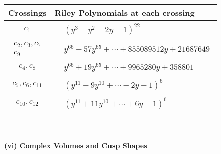 \documentclass[1p]{elsarticle_modified}
\theoremstyle{definition}
\begin{document}
\begin{tabular}{m{50pt}|m{274pt}}
Crossings & \hspace{64pt}Riley Polynomials at each crossing \\
\hline $$\begin{aligned}c_{1}\end{aligned}$$&$\begin{aligned}
&(y^3- y^2+2 y-1)^{22}
\end{aligned}$\\
\hline $$\begin{aligned}c_{2},c_{3},c_{7}\\c_{9}\end{aligned}$$&$\begin{aligned}
&y^{66}-57 y^{65}+\cdots+855089512 y+21687649
\end{aligned}$\\
\hline $$\begin{aligned}c_{4},c_{8}\end{aligned}$$&$\begin{aligned}
&y^{66}+19 y^{65}+\cdots+9965280 y+358801
\end{aligned}$\\
\hline $$\begin{aligned}c_{5},c_{6},c_{11}\end{aligned}$$&$\begin{aligned}
&(y^{11}-9 y^{10}+\cdots-2 y-1)^{6}
\end{aligned}$\\
\hline $$\begin{aligned}c_{10},c_{12}\end{aligned}$$&$\begin{aligned}
&(y^{11}+11 y^{10}+\cdots+6 y-1)^{6}
\end{aligned}$\\
\hline
\end{tabular}\\~\\
\newpage\flushleft \textbf{(vi) Complex Volumes and Cusp Shapes}
\end{document}
